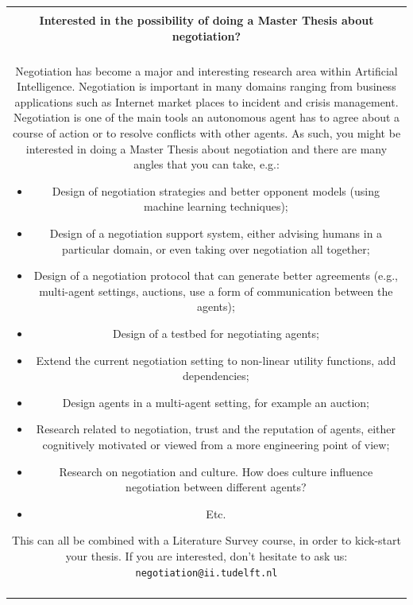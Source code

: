 \documentclass[a4paper]{article}
\begin{document}
\newpage
\begin{center}
\doublespacing
\begin{tabular}{|c|}
\hline
\begin{minipage}{13.5cm}
\hspace{1cm}\\
\textbf{Interested in the possibility of doing a Master Thesis about negotiation?}\\ \\

Negotiation has become a major and interesting research area within Artificial Intelligence. Negotiation is important in many domains ranging from business applications such as Internet market places to incident and crisis management. Negotiation is one of the main tools an autonomous agent has to agree about a course of action or to resolve conflicts with other agents. As such, you might be interested in doing a Master Thesis about negotiation and there are many angles that you can take, e.g.:
\begin{itemize}
\item Design of negotiation strategies and better opponent models (using machine learning techniques);
\item Design of a negotiation support system, either advising humans in a particular domain, or even taking over negotiation all together;
\item Design of a negotiation protocol that can generate better agreements (e.g., multi-agent settings, auctions, use a form of communication between the agents);
\item Design of a testbed for negotiating agents;
\item Extend the current negotiation setting to non-linear utility functions, add dependencies;
\item Design agents in a multi-agent setting, for example an auction;
\item Research related to negotiation, trust and the reputation of agents, either cognitively motivated or viewed from a more engineering point of view;
\item Research on negotiation and culture. How does culture influence negotiation between different agents?
\item Etc.
\end{itemize}
This can all be combined with a Literature Survey course, in order to kick-start your thesis. If you are interested, don't hesitate to ask us: \verb+negotiation@ii.tudelft.nl+ 
\end{minipage}\hspace{.1cm}\\
\hspace{1cm}\\
\hline
\end{tabular}
\end{center}
\singlespacing
\end{document}
